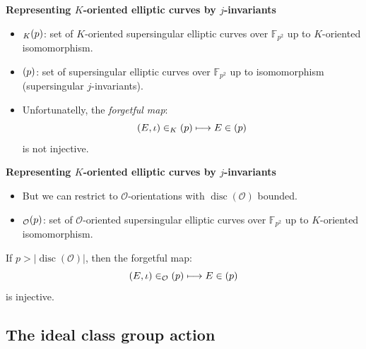 \documentclass[10pt]{beamer}
\theoremstyle{plain}
\theoremstyle{definition}
\newcommand{\F}{\mathbb{F}}
\newcommand{\mO}{\mathcal{O}}
\renewcommand{\(}{\left(}
\renewcommand{\)}{\right)}
\DeclareMathOperator{\disc}{disc}
\let\SS\relax
\DeclareMathOperator{\SS}{SS}
\begin{document}
\begin{frame}
\textbf{Representing $K$-oriented elliptic curves by $j$-invariants}

\vspace{0.5cm}

\begin{itemize}
\item $\SS_K(p)$: set of $K$-oriented supersingular elliptic curves over $\F_{p^2}$ up to $K$-oriented isomomorphism.
\item $\SS(p)$: set of supersingular elliptic curves over $\F_{p^2}$ up to isomomorphism (supersingular $j$-invariants).
\item Unfortunatelly, the \emph{forgetful map}:
\[(E,\iota)\in\SS_K(p)\longmapsto E\in\SS(p)\]
is not injective.
\end{itemize}

\end{frame}

\begin{frame}
\textbf{Representing $K$-oriented elliptic curves by $j$-invariants}

\vspace{0.5cm}

\begin{itemize}
\item But we can restrict to $\mO$-orientations with $\disc(\mO)$ bounded.
\item $\SS_{\mO}(p)$: set of $\mO$-oriented supersingular elliptic curves over $\F_{p^2}$ up to $K$-oriented isomomorphism.
\end{itemize}

\begin{theorem}
If $p>|\disc(\mO)|$, then the forgetful map:
\[(E,\iota)\in\SS_{\mO}(p)\longmapsto E\in\SS(p)\]
is injective.
\end{theorem}

\end{frame}

\subsection{The ideal class group action}
\end{document}

